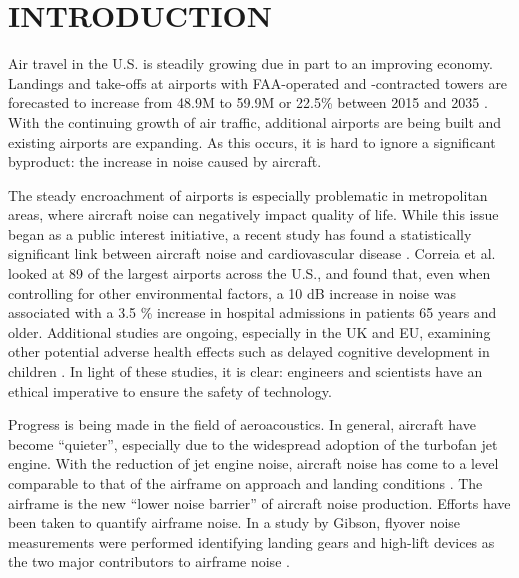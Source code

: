 %
%
%
%
%
%
%
%
%
%


%
%

\chapter{INTRODUCTION}
Air travel in the U.S. is steadily growing due in part to an improving economy. Landings and take-offs at airports with FAA-operated and -contracted towers are forecasted to increase from 48.9M to 59.9M or 22.5\% between 2015 and 2035 \cite{faa2015}. With the continuing growth of air traffic, additional airports are being built and existing airports are expanding. As this occurs, it is hard to ignore a significant byproduct: the increase in noise caused by aircraft.

The steady encroachment of airports is especially problematic in metropolitan areas, where aircraft noise can negatively impact quality of life. While this issue began as a public interest initiative, a recent study has found a statistically significant link between aircraft noise and cardiovascular disease \cite{correia2013}. Correia et al. looked at 89 of the largest airports across the U.S., and found that, even when controlling for other environmental factors, a 10 dB increase in noise was associated with a 3.5 \% increase in hospital admissions in patients 65 years and older. Additional studies are ongoing, especially in the UK and EU, examining other potential adverse health effects such as delayed cognitive development in children \cite{cap2014}. In light of these studies, it is clear: engineers and scientists have an ethical imperative to ensure the safety of technology. 

Progress is being made in the field of aeroacoustics. In general, aircraft have become ``quieter'', especially due to the widespread adoption of the turbofan jet engine. With the reduction of jet engine noise, aircraft noise has come to a level comparable to that of the airframe on approach and landing conditions \cite{dob2010}. The airframe is the new ``lower noise barrier'' of aircraft noise production. Efforts have been taken to quantify airframe noise. In a study by Gibson, flyover noise measurements were performed identifying landing gears and high-lift devices as the two major contributors to airframe noise \cite{gibson1974}.

